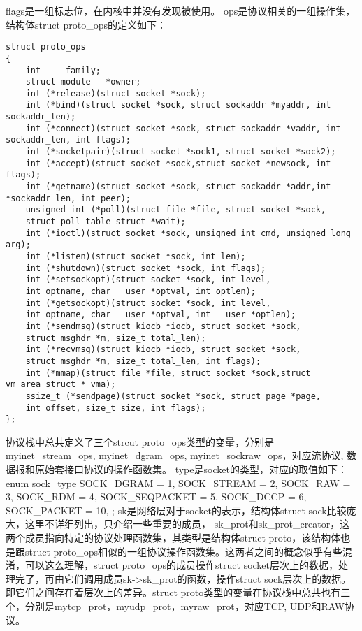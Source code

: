 flags是一组标志位，在内核中并没有发现被使用。
ops是协议相关的一组操作集，结构体struct proto_ops的定义如下：
\begin{verbatim}
struct proto_ops
{
    int     family;
    struct module   *owner;
    int (*release)(struct socket *sock);
    int (*bind)(struct socket *sock, struct sockaddr *myaddr, int sockaddr_len);
    int (*connect)(struct socket *sock, struct sockaddr *vaddr, int sockaddr_len, int flags);
    int (*socketpair)(struct socket *sock1, struct socket *sock2);
    int (*accept)(struct socket *sock,struct socket *newsock, int flags);
    int (*getname)(struct socket *sock, struct sockaddr *addr,int *sockaddr_len, int peer);
    unsigned int (*poll)(struct file *file, struct socket *sock,
    struct poll_table_struct *wait);
    int (*ioctl)(struct socket *sock, unsigned int cmd, unsigned long arg);
    int (*listen)(struct socket *sock, int len);
    int (*shutdown)(struct socket *sock, int flags);
    int (*setsockopt)(struct socket *sock, int level,
    int optname, char __user *optval, int optlen);
    int (*getsockopt)(struct socket *sock, int level,
    int optname, char __user *optval, int __user *optlen);
    int (*sendmsg)(struct kiocb *iocb, struct socket *sock,
    struct msghdr *m, size_t total_len);
    int (*recvmsg)(struct kiocb *iocb, struct socket *sock,
    struct msghdr *m, size_t total_len, int flags);
    int (*mmap)(struct file *file, struct socket *sock,struct vm_area_struct * vma);
    ssize_t (*sendpage)(struct socket *sock, struct page *page,
    int offset, size_t size, int flags);
};
\end{verbatim}
协议栈中总共定义了三个strcut proto\_ops类型的变量，分别是myinet\_stream\_ops, myinet\_dgram\_ops, myinet\_sockraw\_ops，对应流协议, 数据报和原始套接口协议的操作函数集。
    type是socket的类型，对应的取值如下：
    enum sock_type {
        SOCK_DGRAM  = 1,
        SOCK_STREAM = 2,
        SOCK_RAW    = 3,
        SOCK_RDM    = 4,
        SOCK_SEQPACKET  = 5,
        SOCK_DCCP   = 6,
        SOCK_PACKET = 10,
    };
    sk是网络层对于socket的表示，结构体struct sock比较庞大，这里不详细列出，只介绍一些重要的成员，
    sk_prot和sk_prot_creator，这两个成员指向特定的协议处理函数集，其类型是结构体struct proto，该结构体也是跟struct proto_ops相似的一组协议操作函数集。这两者之间的概念似乎有些混淆，可以这么理解，struct proto_ops的成员操作struct socket层次上的数据，处理完了，再由它们调用成员sk->sk_prot的函数，操作struct sock层次上的数据。即它们之间存在着层次上的差异。struct proto类型的变量在协议栈中总共也有三个，分别是mytcp_prot，myudp_prot，myraw_prot，对应TCP, UDP和RAW协议。
